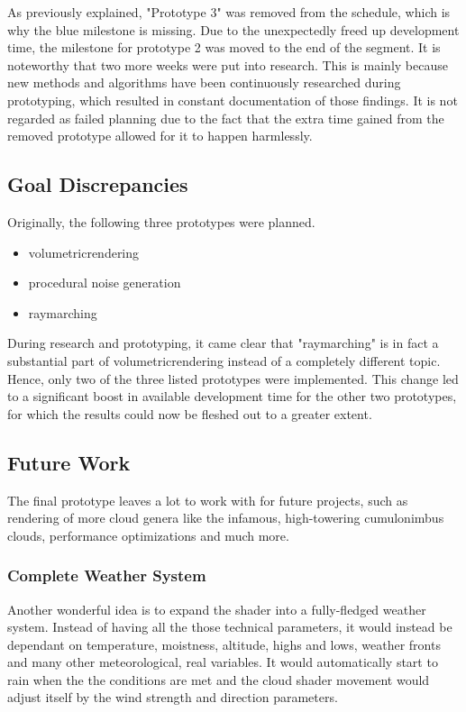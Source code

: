 \vspace{\baselineskip}
\noindent
As previously explained, "Prototype 3" was removed from the schedule, which is why the blue milestone is missing. Due to the unexpectedly freed up development time, the milestone for prototype 2 was moved to the end of the segment.
\emptyline
It is noteworthy that two more weeks were put into research. This is mainly because new methods and algorithms have been continuously researched during prototyping, which resulted in constant documentation of those findings.
It is not regarded as failed planning due to the fact that the extra time gained from the removed prototype allowed for it to happen harmlessly.

\clearpage
\subsection{Goal Discrepancies}
\label{section:projectmanagement:goals}
Originally, the following three prototypes were planned.
\begin{itemize}
    \item \gls{volumetricrendering}
    \item \gls{procedural} \gls{noise} generation
    \item \gls{raymarching}
\end{itemize}
During research and prototyping, it came clear that "\gls{raymarching}" is in fact a substantial part of \gls{volumetricrendering} instead of a completely different topic.
Hence, only two of the three listed prototypes were implemented. This change led to a significant boost in available development time for the other two prototypes, for which the results could now be fleshed out to a greater extent.

\subsection{Future Work}
The final prototype leaves a lot to work with for future projects, such as rendering of more cloud genera like the infamous, high-towering cumulonimbus clouds, performance optimizations and much more.

\subsubsection{Complete Weather System}
Another wonderful idea is to expand the shader into a fully-fledged weather system. Instead of having all the those technical \gls{parameters}, it would instead be dependant on temperature, moistness, altitude, highs and lows, weather fronts and many other meteorological, real variables.
It would automatically start to rain when the the conditions are met and the cloud shader movement would adjust itself by the wind strength and direction \gls{parameters}.

